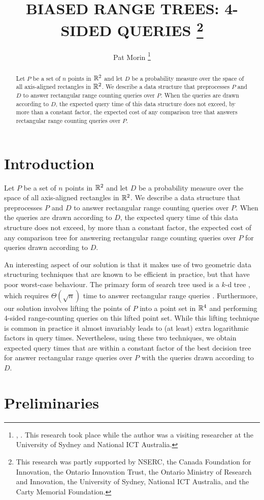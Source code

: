 \documentclass{patmorin}
\title{\MakeUppercase{Biased Range Trees: 4-Sided Queries}%
	\thanks{This research was partly supported by NSERC, the Canada
	Foundation for Innovation, the Ontario Innovation Trust, the
	Ontario Ministry of Research and Innovation, the University
	of Sydney, National ICT Australia, and the Carty Memorial
	Foundation.}}
\author{Pat Morin%
	\thanks{\affil{Carleton University}, \email{morin@scs.carleton.ca}.
	This research took place while the author was a visiting researcher
	at the University of Sydney and National ICT Australia.}}
\begin{document}
\maketitle

\begin{abstract}
Let $P$ be a set of $n$ points in $\mathbb{R}^2$ and let $D$ be a probability
measure over the space of all axis-aligned rectangles in $\mathbb{R}^2$.
We describe a data structure that preprocesses $P$ and $D$ to answer
rectangular range counting queries over $P$.  When the queries are drawn
according to $D$, the expected query time of this data structure does
not exceed, by more than a constant factor, the expected cost of any
comparison tree that answers rectangular range counting queries over $P$.
\end{abstract}


\section{Introduction}

Let $P$ be a set of $n$ points in $\mathbb{R}^2$ and let $D$ be a probability
measure over the space of all axis-aligned rectangles in $\mathbb{R}^2$.
We describe a data structure that preprocesses $P$ and $D$ to answer
rectangular range counting queries over $P$.  When the queries are drawn
according to $D$, the expected query time of this data structure does
not exceed, by more than a constant factor, the expected cost of any
comparison tree for answering rectangular range counting queries over $P$
for queries drawn according to $D$.

An interesting aspect of our solution is that it makes use of two
geometric data structuring techniques that are known to be efficient
in practice, but that have poor worst-case behaviour.  The primary
form of search tree used is a $k$-d tree \cite{S}, which requires
$\Theta(\sqrt{n})$ time to answer rectangular range queries \cite{dbXX}.
Furthermore, our solution involves lifting the points of $P$ into a point
set in $\mathbb{R}^4$ and performing 4-sided range-counting queries on this lifted
point set.  While this lifting technique is common in practice it almost
invariably leads to (at least) extra logarithmic factors in query times.
Nevertheless, using these two techniques, we obtain expected query times
that are within a constant factor of the best decision tree for answer
rectangular range queries over $P$ with the queries drawn according
to $D$.

\section{Preliminaries}
\end{document}

